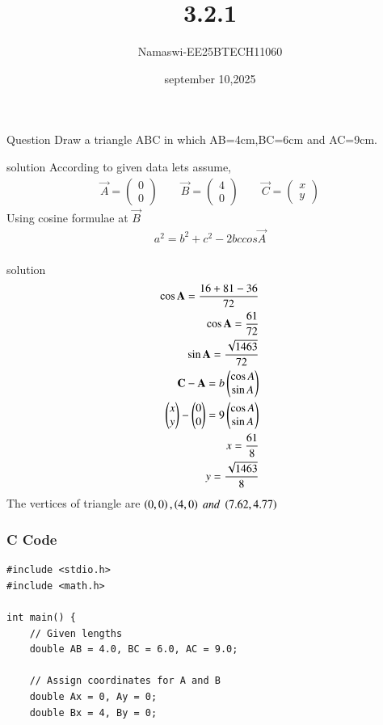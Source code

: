 \documentclass{beamer}
\begin{document}
\title 
{3.2.1}
\date{september 10,2025}


\author 
{Namaswi-EE25BTECH11060}
\frame{\titlepage}
\begin{frame}{Question}
 Draw a triangle ABC in which AB=4cm,BC=6cm and AC=9cm.
\end{frame}
\begin{frame}{solution}
According to given data lets assume,\\
\begin{align*}
\vec{A}=\begin{pmatrix}0\\0\end{pmatrix}\qquad 
\vec{B}=\begin{pmatrix}4\\0\end{pmatrix}\qquad 
\vec{C}=\begin{pmatrix}x\\y\end{pmatrix}   
\end{align*}
Using cosine formulae at $\vec{B}$ 
\begin{align}
a^2=b^2+c^2-2bccos\vec{A}\\
\end{align}
\end{frame}

\begin{frame}{solution}
\begin{align}
\cos{\mathbf{A}}=\frac{16+81-36}{72}\\
\cos{\mathbf{A}}=\frac{61}{72}\\
\sin{\mathbf{A}}=\frac{\sqrt{1463}}{72}\\
\mathbf{C}-\mathbf{A}=b\begin{pmatrix}\cos{A}\\ \sin{A}\end{pmatrix}\\
\begin{pmatrix}x\\y\end{pmatrix}-\begin{pmatrix}0\\0\end{pmatrix}=9\begin{pmatrix}\cos{A}\\ \sin{A}\end{pmatrix}\\
x=\frac{61}{8}\\
y=\frac{\sqrt{1463}}{8}
\end{align}
The vertices of triangle are $\left(0,0\right),\left(4,0\right)\; and\; \left(7.62,4.77\right) $\\  
\end{frame}
 
\begin{frame}[fragile]
    \frametitle{C Code }

    \begin{lstlisting}
#include <stdio.h>
#include <math.h>

int main() {
    // Given lengths
    double AB = 4.0, BC = 6.0, AC = 9.0;

    // Assign coordinates for A and B
    double Ax = 0, Ay = 0;
    double Bx = 4, By = 0;

 \end{lstlisting}
\end{frame}
\end{document}
